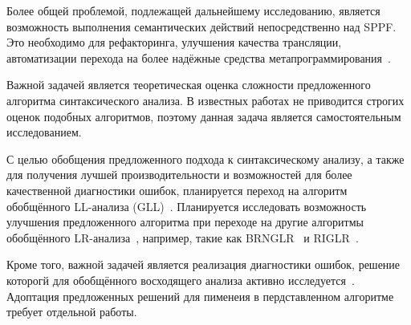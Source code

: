 Более общей проблемой, подлежащей дальнейшему исследованию, является возможность выполнения семантических действий непосредственно над SPPF. Это необходимо для рефакторинга, улучшения качества трансляции, автоматизации перехода на более надёжные средства метапрограммирования~\cite{JSStagedMetaProgramming,JSStagedMetaProgrammingFull}.

Важной задачей является теоретическая оценка сложности предложенного алгоритма синтаксического анализа. В известных работах не приводится строгих оценок подобных алгоритмов, поэтому данная задача является самостоятельным исследованием.

С целью обобщения предложенного подхода к синтаксическому анализу, а также для получения лучшей производительности и возможностей для более качественной диагностики ошибок, планируется переход на алгоритм обобщённого LL-анализа (GLL)~\cite{GLL,AbstractGLL}. Планируется исследовать возможность улучшения предложенного алгоритма при переходе на другие алгоритмы обобщённого LR-анализа~\cite{GeneralisedlrBIG}, например, такие как BRNGLR~\cite{BRNGLR} и RIGLR~\cite{RIGLR}.

Кроме того, важной задачей является реализация диагностики ошибок, решение которогй для обобщённого восходящего анализа активно исследуется~\cite{RNGLRSyntaxerror1,RNGLRSyntaxerror2, RNGLRSyntaxerror3, RNGLRSyntaxerror4}. Адоптация предложенных решений для пименеия в пердставленном алгоритме требует отдельной работы.

\clearpage

